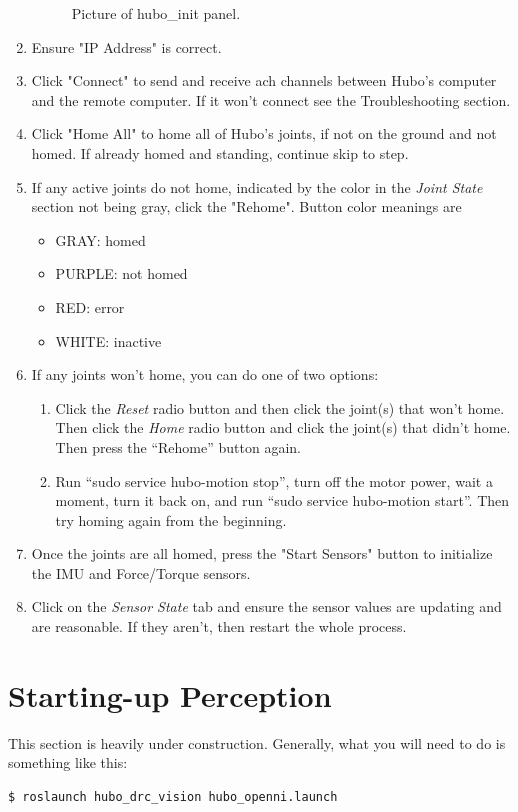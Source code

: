 \documentclass[letterpaper, 10 pt]{report}
\begin{document}
\begin{enumerate}
\begin{figure}[ht]
    \caption{Picture of hubo\_init panel.}
    \label{fig:hubo-init-image}
  \end{figure}
  \item Ensure "IP Address" is correct.
  \item Click "Connect" to send and receive ach channels between Hubo's computer and the remote computer. If it won't connect see the Troubleshooting section.
  \item Click "Home All" to home all of Hubo's joints, if not on the ground and not homed. If already homed and standing, continue skip to step.
  \item If any active joints do not home, indicated by the color in the \textit{Joint State} section not being gray, click the "Rehome". Button color meanings are
    \begin{itemize}
      \item GRAY: homed
      \item PURPLE: not homed
      \item RED: error
      \item WHITE: inactive
    \end{itemize}
  \item If any joints won't home, you can do one of two options:
    \begin{enumerate}
      \item Click the \textit{Reset} radio button and then click the joint(s) that won't home. Then click the \textit{Home} radio button and click the joint(s) that didn't home. Then press the ``Rehome'' button again.
      \item Run ``sudo service hubo-motion stop'', turn off the motor power, wait a moment, turn it back on, and run ``sudo service hubo-motion start''. Then try homing again from the beginning.
    \end{enumerate}
  \item Once the joints are all homed, press the "Start Sensors" button to initialize the IMU and Force/Torque sensors.
  \item Click on the \textit{Sensor State} tab and ensure the sensor values are updating and are reasonable. If they aren't, then restart the whole process.
\end{enumerate}

\section{Starting-up Perception} \label{sec:starting-up-perception}
This section is heavily under construction. Generally, what you will need to do is something like this:
  \begin{lstlisting}[language=bash]
    $ roslaunch hubo_drc_vision hubo_openni.launch
  \end{lstlisting}
  
\end{document}
